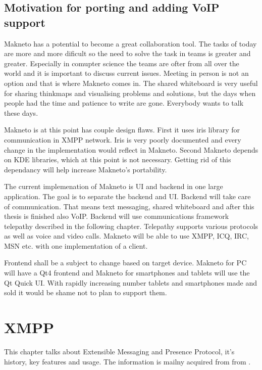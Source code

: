 

\section{Motivation for porting and adding VoIP support}
Makneto has a potential to become a great collaboration tool. The tasks of today are more and more dificult so the need to solve the task in teams is greater and greater. Especially in comupter science the teams are ofter from all over the world and it is important to discuss current issues. Meeting in person is not an option and that is where Makneto comes in. The shared whiteboard is very useful for sharing thinkmaps and visualising problems and solutions, but the days when people had the time and patience to write are gone. Everybody wants to talk these days.  

Makneto is at this point has couple design flaws. First it uses iris library for communication in XMPP network. Iris is very poorly documented and every change in the implementation would reflect in Makneto. Second Makneto depends on KDE libraries, which at this point is not necessary. Getting rid of this dependancy will help increase Makneto's portability. 

The current implemenation of Makneto is UI and backend in one large application. The goal is to separate the backend and UI. Backend will take care of communication. That means text messaging, shared whiteboard and after this thesis is finished also VoIP. Backend will use communications framework telepathy described in the following chapter. Telepathy supports various protocols as well as voice and video calls. Makneto will be able to use XMPP, ICQ, IRC, MSN etc. with one implementation of a client.

Frontend shall be a subject to change based on target device. Makneto for PC will have a Qt4 frontend and Makneto for smartphones and tablets will use the Qt Quick UI. With rapidly increasing number tablets and smartphones made and sold it would be shame not to plan to support them.  





\chapter{XMPP}
This chapter talks about Extensible Messaging and Presence Protocol\cite{xmpp}, it's history, key features and usage. The information is mailny acquired from from \cite{xmppBook,xmppCoreRFC,xmppIMRFC}.

